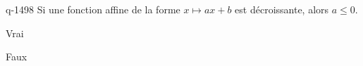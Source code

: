 \begin{truefalse}{q-1498}
Si une fonction affine de la forme $x\mapsto ax+b$ est décroissante, alors $a\leq 0$.
\item* Vrai
\item Faux
\end{truefalse}

